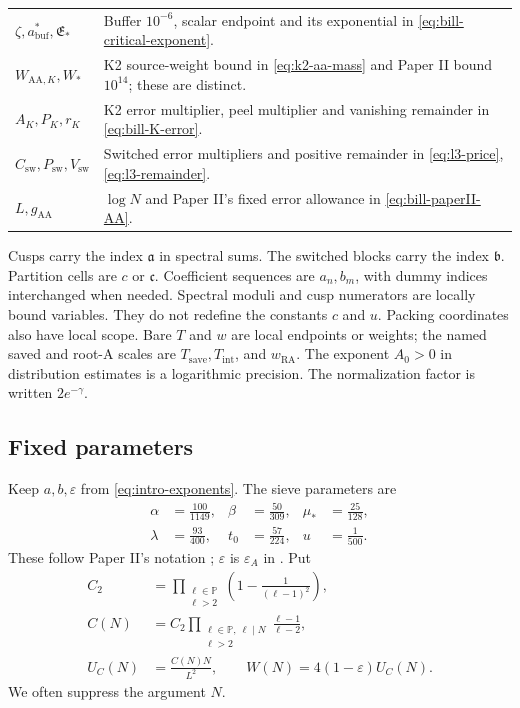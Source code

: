 \begin{longtable}{@{}p{.27\linewidth}p{.67\linewidth}@{}}
\(\zeta,a_{\mathrm{buf}}^*,\mathfrak E_*\) & Buffer $10^{-6}$, scalar endpoint and its exponential in \eqref{eq:bill-critical-exponent}.\\
\(W_{\mathrm{AA},K},W_*\) & K2 source-weight bound in \eqref{eq:k2-aa-mass} and Paper II bound $10^{14}$; these are distinct.\\
\(A_K,P_K,r_K\) & K2 error multiplier, peel multiplier and vanishing remainder in \eqref{eq:bill-K-error}.\\
\(C_{\mathrm{sw}},P_{\mathrm{sw}},V_{\mathrm{sw}}\) & Switched error multipliers and positive remainder in \eqref{eq:l3-price}, \eqref{eq:l3-remainder}.\\
\(L,g_{\mathrm{AA}}\) & $\log N$ and Paper II's fixed error allowance in \eqref{eq:bill-paperII-AA}.\\
\hline
\end{longtable}
\endgroup

Cusps carry the index \(\mathfrak a\) in spectral sums.
The switched blocks carry the index \(\mathfrak b\).
Partition cells are \(c\) or \(\mathfrak c\).
Coefficient sequences are \(a_n,b_m\), with dummy indices interchanged when needed.
Spectral moduli and cusp numerators are locally bound variables.
They do not redefine the constants \(c\) and \(u\).
Packing coordinates also have local scope.
Bare \(T\) and \(w\) are local endpoints or weights; the named saved and
root-A scales are \(T_{\mathrm{save}},T_{\mathrm{int}}\), and \(w_{\mathrm{RA}}\).
The exponent \(A_0>0\) in distribution estimates is a logarithmic precision.
The normalization factor is written \(2e^{-\gamma}\).

\subsection{Fixed parameters}

Keep \(a,b,\varepsilon\) from \eqref{eq:intro-exponents}.
The sieve parameters are
\begin{equation}\label{eq:not-sieve-parameters}
\begin{aligned}
 \alpha&=\frac{100}{1149},&\beta&=\frac{50}{309},&
 \mu_*&=\frac{25}{128},\\
 \lambda&=\frac{93}{400},&t_0&=\frac{57}{224},&
 u&=\frac1{500}.
\end{aligned}
\end{equation}
These follow Paper II's notation
\cite[(1.5)]{PaperII}; $\varepsilon$ is $\varepsilon_A$ in
\cite[(1.3)]{PaperII}.
Put
\begin{equation}\label{eq:not-normalization}
\begin{aligned}
 C_2&=\prod_{\substack{\ell\in\mathbb P\\\ell>2}}
       \left(1-\frac1{(\ell-1)^2}\right),\\
 C(N)&=C_2\prod_{\substack{\ell\in\mathbb P,\ \ell\mid N\\\ell>2}}
                   \frac{\ell-1}{\ell-2},\\
 U_C(N)&=\frac{C(N)N}{L^2},\qquad
 W(N)=4(1-\varepsilon)U_C(N).
\end{aligned}
\end{equation}
We often suppress the argument \(N\).

